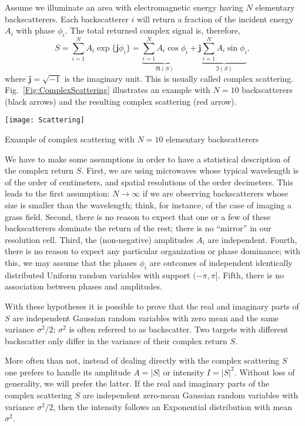 Assume we illuminate an area with electromagnetic energy having $N$ elementary backscatterers.
Each backscatterer $i$ will return a fraction of the incident energy $A_i$ with phase $\phi_i$.
The total returned complex signal is, therefore,
\begin{equation}
S = \sum_{i=1}^{N} A_i \exp\{\mathbf j \phi_i\} = 
\underbrace{{\sum_{i=1}^{N} A_i \cos \phi_i}}_{\Re(S)} +\mathbf j \underbrace{ \sum_{i=1}^{N} A_i \sin \phi_i}_{\Im(S)}, 
\label{Eq:ComplexBackscatter}
\end{equation}
where $\mathbf j=\sqrt{-1}$ is the imaginary unit.
This is usually called complex scattering.
Fig.~\ref{Fig:ComplexScattering} illustrates an example with $N=10$ backscatterers (black arrows) and the resulting complex scattering (red arrow).

\begin{marginfigure}
\texttt{[image: Scattering]}
\caption{Example of complex scattering with $N=10$ elementary backscatterers}\label{Fig:ComplexScattering}
\end{marginfigure}

We have to make some assumptions in order to have a statistical description of the complex return $S$.
First, we are using microwaves whose typical wavelength is of the order of centimeters, and spatial resolutions of the order decimeters.
This leads to the first assumption: $N\to\infty$ if we are observing backscatterers whose size is smaller than the wavelength; think, for instance, of the case of imaging a grass field.
Second, there is no reason to expect that one or a few of these backscatterers dominate the return of the rest; there is no ``mirror'' in our resolution cell.
Third, the (non-negative) amplitudes $A_i$ are independent.
Fourth, there is no reason to expect any particular organization or phase dominance; with this, we may assume that the phases $\phi_i$ are outcomes of independent identically distributed Uniform random variables with support $(-\pi,\pi]$.
Fifth, there is no association between phases and amplitudes.

With these hypotheses it is possible to prove that the real and imaginary parts of $S$ are independent Gaussian random variables with zero mean and the same variance $\sigma^2/2$; $\sigma^2$ is often referred to as backscatter.
Two targets with different backscatter only differ in the variance of their complex return $S$.

More often than not, instead of dealing directly with the complex scattering $S$ one prefers to handle its amplitude $A=|S|$ or intensity $I=|S|^2$.
Without loss of generality, we will prefer the latter.
If the real and imaginary parts of the complex scattering $S$ are independent zero-mean Gaussian random variables with variance $\sigma^2/2$, then the intensity follows an Exponential distribution with mean $\sigma^2$.

